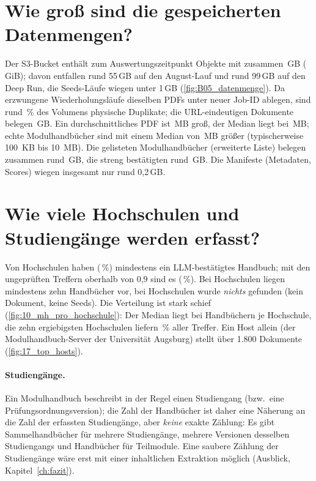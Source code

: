 \section{Wie groß sind die gespeicherten Datenmengen?}
Der S3-Bucket enthält zum Auswertungszeitpunkt \zSpeicherObjekte{} Objekte mit zusammen \zSpeicherGB{}\,GB (\zSpeicherGiB{}\,GiB); davon entfallen rund 55\,GB auf den August-Lauf und rund 99\,GB auf den Deep Run, die Seeds-Läufe wiegen unter 1\,GB (\cref{fig:B05_datenmenge}). Da erzwungene Wiederholungsläufe dieselben PDFs unter neuer Job-ID ablegen, sind rund \zDupVolumePct\,\% des Volumens physische Duplikate; die URL-eindeutigen Dokumente belegen \zUniqueGB{}\,GB. Ein durchschnittliches PDF ist \zMeanMB{}\,MB groß, der Median liegt bei \zMedianMBAll{}\,MB; echte Modulhandbücher sind mit einem Median von \zMedianMBMH{}\,MB größer (typischerweise 100~KB bis 10~MB). Die gelisteten Modulhandbücher (erweiterte Liste) belegen zusammen rund \zMHVolumeGB{}\,GB, die streng bestätigten rund \zMHStrictVolumeGB{}\,GB. Die Manifeste (Metadaten, Scores) wiegen insgesamt nur rund 0,2\,GB.


\section{Wie viele Hochschulen und Studiengänge werden erfasst?}
Von \zUnisTotal{} Hochschulen haben \zUnisStrict{} (\zUnisStrictPct\,\%) mindestens ein LLM-bestätigtes Handbuch; mit den ungeprüften Treffern oberhalb von 0,9 sind es \zUnisLikely{} (\zUnisLikelyPct\,\%). Bei \zUnisGeTen{} Hochschulen liegen mindestens zehn Handbücher vor, bei \zUnisNone{} Hochschulen wurde \emph{nichts} gefunden (kein Dokument, keine Seeds). Die Verteilung ist stark schief (\cref{fig:10_mh_pro_hochschule}): Der Median liegt bei \zMedianMH{} Handbüchern je Hochschule, die zehn ergiebigsten Hochschulen liefern \zTopTenShare\,\% aller Treffer. Ein Host allein (der Modulhandbuch-Server der Universität Augsburg) stellt über 1.800 Dokumente (\cref{fig:17_top_hosts}).


\paragraph{Studiengänge.} Ein Modulhandbuch beschreibt in der Regel einen Studiengang (bzw.\ eine Prüfungsordnungsversion); die Zahl der Handbücher ist daher eine Näherung an die Zahl der erfassten Studiengänge, aber \emph{keine} exakte Zählung: Es gibt Sammelhandbücher für mehrere Studiengänge, mehrere Versionen desselben Studiengangs und Handbücher für Teilmodule. Eine saubere Zählung der Studiengänge wäre erst mit einer inhaltlichen Extraktion möglich (Ausblick, Kapitel~\ref{ch:fazit}).

